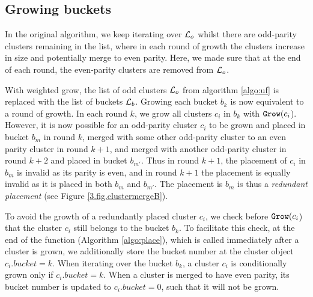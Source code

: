 

\subsection{Growing buckets}

In the original algorithm, we keep iterating over $\mathcal{L}_o$ whilst there are odd-parity clusters remaining in the list, where in each round of growth the clusters increase in size and potentially merge to even parity. Here, we made sure that at the end of each round, the even-parity clusters are removed from $\mathcal{L}_o$. 

With weighted grow, the list of odd clusters $\mathcal{L}_o$ from algorithm \ref{algo:uf} is replaced with the list of buckets $\mathcal{L}_b$. Growing each bucket $b_k$ is now equivalent to a round of growth. In each round $k$, we grow all clusters $c_i$ in $b_k$ with $\texttt{Grow}(c_i$). However, it is now possible for an odd-parity cluster $c_i$ to be grown and placed in bucket $b_m$ in round $k$, merged with some other odd-parity cluster to an even parity cluster in round $k+1$, and merged with another odd-parity cluster in round $k+2$ and placed in bucket $b_{m'}$. Thus in round $k+1$, the placement of $c_i$ in $b_m$ is invalid as its parity is even, and in round $k+1$ the placement is equally invalid as it is placed in both $b_m$ and $b_{m'}$. The placement is $b_m$ is thus a \emph{redundant placement} (see Figure \ref{3.fig.clustermergeB}).

To avoid the growth of a redundantly placed cluster $c_i$, we check before $\texttt{Grow}(c_i$) that the cluster $c_i$ still belongs to the bucket $b_k$. To facilitate this check, at the end of the function  (Algorithm \ref{algo:place}), which is called immediately after a cluster is grown, we additionally store the bucket number at the cluster object $c_i.bucket = k$. When iterating over the bucket $b_k$, a cluster $c_i$ is conditionally grown only if $c_i.bucket = k$. When a cluster is merged to have even parity, its bucket number is updated to $c_i.bucket=0$, such that it will not be grown.  

